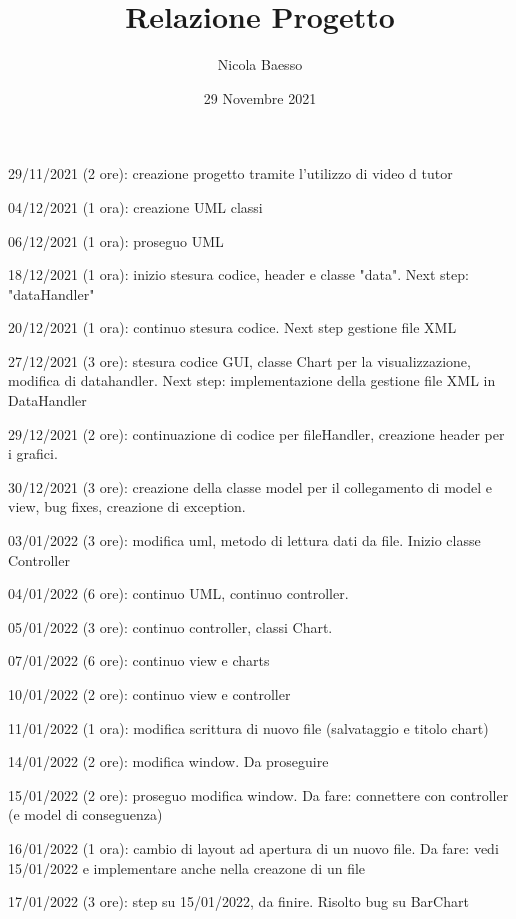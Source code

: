 \documentclass[10pt]{article}
\author{Nicola Baesso}
\title{Relazione Progetto}
\date{29 Novembre 2021}
\begin{document}
	\setlength{\baselineskip}{13 pt}
	
	\maketitle
	
	
	29/11/2021 (2 ore): creazione progetto tramite l'utilizzo di video d tutor
	
	04/12/2021 (1 ora): creazione UML classi
	
	06/12/2021 (1 ora): proseguo UML
	
	18/12/2021 (1 ora): inizio stesura codice, header e classe "data". Next step: "dataHandler"
	
	20/12/2021 (1 ora): continuo stesura codice. Next step gestione file XML
	
	27/12/2021 (3 ore): stesura codice GUI, classe Chart per la visualizzazione, modifica di datahandler. Next step: implementazione della gestione file XML in DataHandler
	
	29/12/2021 (2 ore): continuazione di codice per fileHandler, creazione header per i grafici.
     
    30/12/2021 (3 ore): creazione della classe model per il collegamento di model e view, bug fixes, creazione di exception.
    
    03/01/2022 (3 ore): modifica uml, metodo di lettura dati da file. Inizio classe Controller
    
    04/01/2022 (6 ore): continuo UML, continuo controller.
    
    05/01/2022 (3 ore): continuo controller, classi Chart.
    
    07/01/2022 (6 ore): continuo view e charts
    
    10/01/2022 (2 ore): continuo view e controller
    
    11/01/2022 (1 ora): modifica scrittura di nuovo file (salvataggio e titolo chart)
    
    14/01/2022 (2 ore): modifica window. Da proseguire
    
    15/01/2022 (2 ore): proseguo modifica window. Da fare: connettere con controller (e model di conseguenza)
    
    16/01/2022 (1 ora): cambio di layout ad apertura di un nuovo file. Da fare: vedi 15/01/2022 e implementare anche nella creazone di un file
    
    17/01/2022 (3 ore): step su 15/01/2022, da finire. Risolto bug su BarChart
    
\end{document}

